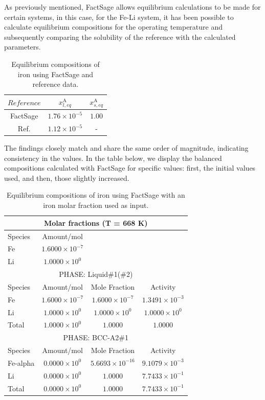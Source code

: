 As previously mentioned, FactSage allows equilibrium calculations to be made for certain systems, in this case, for the Fe-Li system, it has been 
possible to calculate equilibrium compositions for the operating temperature and subsequently 
comparing the solubility of the reference with the calculated parameters.

\begin{table}[ht]
	\centering
	\label{tab:your_label_here}
	\begin{tabular}{ccc}
	\hline
	$Reference$ & $x^{\text{A}}_{l,eq}$ & $x^{\text{A}}_{s,eq}$ \\ \hline
	FactSage \cite{Bale2016} & $1.76 \times 10^{-5} $        & $1.00$         \\
	Ref. \cite{Leavenworth1961TheSO}       & $1.12 \times 10^{-5}$         & -         \\
	\end{tabular}
	\caption{Equilibrium compositions of iron using FactSage and reference data.}
\end{table}

The findings closely match and share the same order of magnitude, indicating consistency in the values. In the table below, we 
display the balanced compositions calculated with FactSage for specific values: first, the initial values used, and then, those slightly increased.

\begin{table}[ht]
	\centering
	\label{tab:updated_stream_phases}
	\begin{tabular}{lccc}
	\hline
	\multicolumn{4}{c}{Molar fractions (T = 668 K)} \\
	\hline
	Species & Amount/mol & & \\
	\hline
	Fe & $1.6000 \times 10^{-7}$ & & \\
	Li & $1.0000 \times 10^{0}$ & & \\
	\hline
	\multicolumn{4}{c}{PHASE: Liquid\#1(\#2)} \\
	\hline
	Species & Amount/mol & Mole Fraction & Activity \\
	\hline
	Fe & $1.6000 \times 10^{-7}$ & $1.6000 \times 10^{-7}$ & $1.3491 \times 10^{-3}$ \\
	Li & $1.0000 \times 10^{0}$ & $1.0000 \times 10^{0}$ & $1.0000 \times 10^{0}$ \\
	Total & $1.0000 \times 10^{0}$ & $1.0000$ & $1.0000$ \\
	\hline
	\multicolumn{4}{c}{PHASE: BCC-A2\#1} \\
	\hline
	Species & Amount/mol & Mole Fraction & Activity \\
	\hline
	Fe-alpha & $0.0000 \times 10^{0}$ & $5.6693 \times 10^{-16}$ & $9.1079 \times 10^{-3}$ \\
	Li & $0.0000 \times 10^{0}$ & $1.0000$ & $7.7433 \times 10^{-1}$ \\
	Total & $0.0000 \times 10^{0}$ & $1.0000$ & $7.7433 \times 10^{-1}$ \\
	\hline
	\end{tabular}
	\caption{Equilibrium compositions of iron using FactSage with an iron molar fraction used as input.}

\end{table}
	
